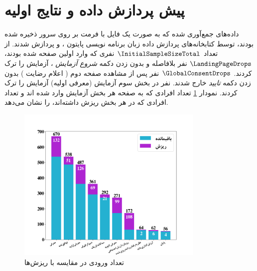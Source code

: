 \section{پیش پردازش داده و نتایج اولیه}
داده‌های جمع‌آوری شده که به صورت یک فایل با فرمت
بر روی سرور ذخیره شده بودند، توسط کتابخانه‌های پردازش داده زبان برنامه نویسی پایتون
\!،
و
پردازش شدند. از تعداد $\InitialSampleSizeTotal$
نفری که وارد اولین صفحه شده بودند،
$\LandingPageDrops$
نفر بلافاصله و بدون زدن دکمه
\textit{شروع آزمایش}
\!،
آزمایش را ترک کردند.
$\GlobalConsentDrops$
نفر پس از مشاهده صفحه دوم
\!(
اعلام رضایت
)
بدون زدن دکمه
\textit{تایید}
خارج شدند. 
\otherPIIDisClosureDrops
نفر در بخش سوم آزمایش
\!(معرفی اولیه)
آزمایش را ترک کردند.
نمودار
\ref{fig:PageNotSubmitedDataFrame}
تعداد افرادی که به صفحه هر بخش آزمایش وارد شده اند و تعداد افرادی  که در هر بخش ریزش داشته‌اند، را نشان می‌دهد.
\begin{figure}[ht]
    \centerline{\includegraphics[width=0.8\textwidth]{./img/PageNotSubmitedDataFrame.png}}
    \caption{تعداد ورودی در مقایسه با ریزش‌ها}
    \label{fig:PageNotSubmitedDataFrame}
\end{figure}




% 

